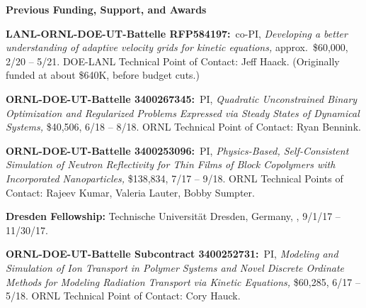 \documentclass[11pt]{letter}
\begin{document}
 
{\LARGE\bf Previous Funding, Support, and Awards}
    \begin{description} 
    
    \item
\textbf{LANL-ORNL-DOE-UT-Battelle RFP584197:}~co-PI, {\sl Developing a better understanding of adaptive velocity grids for kinetic equations,} approx.~\$60,000, 2/20 -- 5/21. DOE-LANL Technical Point of Contact: Jeff Haack. (Originally funded at about \$640K, before budget cuts.)
 
    \item
\textbf{ORNL-DOE-UT-Battelle 3400267345:}~PI, {\sl Quadratic Unconstrained Binary Optimization and Regularized Problems Expressed via Steady States of Dynamical Systems,} \$40,506, 6/18 -- 8/18. ORNL Technical Point of Contact: Ryan Bennink.
    
    
    
    \item
\textbf{ORNL-DOE-UT-Battelle 3400253096:}~PI, {\sl Physics-Based, Self-Consistent Simulation of Neutron Reflectivity for Thin Films of Block Copolymers with Incorporated Nanoparticles,} \$138,834, 7/17 -- 9/18. ORNL Technical Points of Contact: Rajeev Kumar, Valeria Lauter, Bobby Sumpter.

    \item
\textbf{Dresden Fellowship:} Technische Universit\"{a}t Dresden, Germany,  , 9/1/17 -- 11/30/17.
    
    \item
\textbf{ORNL-DOE-UT-Battelle Subcontract 3400252731:}~PI, {\sl Modeling and Simulation of Ion Transport in Polymer Systems and Novel Discrete Ordinate Methods for Modeling Radiation Transport via Kinetic Equations,} \$60,285, 6/17 -- 5/18. ORNL Technical Point of Contact: Cory Hauck. 




\end{description}
\end{document}
